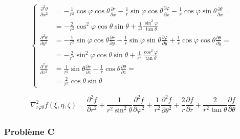 \documentclass
[
a4paper,                      %
twoside,					  %
12pt,                         %
abstract,		      %
fleqn,                        %
]
{scrartcl} %
\begin{document}
\begin{description}
\begin{equation}
\begin{cases}
\frac{\partial^{2} \theta}{\partial x^{2}}&=-\frac{1}{r^{2}}\cos{\varphi}\cos{\theta}\frac{\partial r}{\partial x}-\frac{1}{r}\sin{\varphi}\cos{\theta}\frac{\partial \varphi}{\partial x}-\frac{1}{r}\cos{\varphi}\sin{\theta}\frac{\partial \theta}{\partial x}=\\
&=-\frac{2}{r^{2}}\cos^{2}{\varphi}\cos{\theta}\sin{\theta}+\frac{1}{r^{2}}\frac{\sin^{2}{\varphi}}{\tan{\theta}}\\
\frac{\partial^{2} \theta}{\partial y^{2}}&=-\frac{1}{r^{2}}\sin{\varphi}\cos{\theta}\frac{\partial r}{\partial y}-\frac{1}{r}\sin{\varphi}\sin{\theta}\frac{\partial \varphi}{\partial y}+\frac{1}{r}\cos{\varphi}\cos{\theta}\frac{\partial \theta}{\partial y}=\\
&=-\frac{2}{r^{2}}\sin^{2}{\varphi}\cos{\theta}\sin{\theta}+\frac{1}{r^{2}}\frac{\cos^{2}{\varphi}}{\tan{\theta}}\\
\frac{\partial^{2}\theta}{\partial z^{2}}&=\frac{1}{r^{2}}\sin{\theta}\frac{\partial r}{\partial z}-\frac{1}{r}\cos{\theta}\frac{\partial\theta}{\partial z}=\\
&=\frac{2}{r^{2}}\cos{\theta}\sin{\theta}
\end{cases}
\end{equation}

\begin{equation}
\nabla_{r\varphi\theta}^{2}f\left(\xi,\eta,\zeta\right)=\frac{\partial^{2} f}{\partial r^{2}}+\frac{1}{r^{2}\sin^{2}{\theta}}\frac{\partial^{2} f}{\partial\varphi^{2}}+\frac{1}{r^{2}}\frac{\partial^{2} f}{\partial\theta^{2}}+\frac{2}{r}\frac{\partial f}{\partial r}+\frac{2}{r^{2}\tan{\theta}}\frac{\partial f}{\partial\theta}
\end{equation}

\end{description}

\newpage

\subsubsection{Probl\`eme C}
\end{document}
